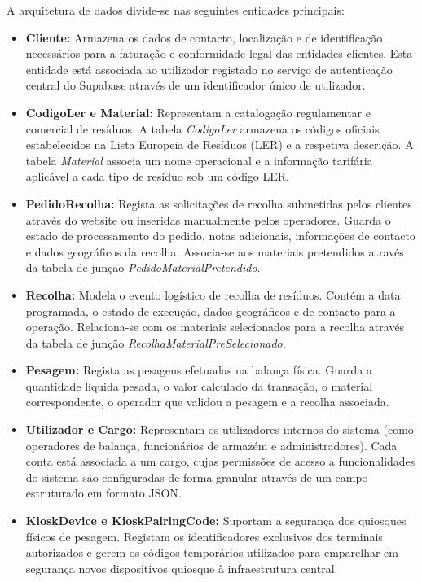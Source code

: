 A arquitetura de dados divide-se nas seguintes entidades principais:
\begin{itemize}
    \item \textbf{Cliente:} Armazena os dados de contacto, localização e de identificação necessários para a faturação e conformidade legal das entidades clientes. Esta entidade está associada ao utilizador registado no serviço de autenticação central do Supabase através de um identificador único de utilizador.
    \item \textbf{CodigoLer e Material:} Representam a catalogação regulamentar e comercial de resíduos. A tabela \textit{CodigoLer} armazena os códigos oficiais estabelecidos na Lista Europeia de Resíduos (LER) e a respetiva descrição. A tabela \textit{Material} associa um nome operacional e a informação tarifária aplicável a cada tipo de resíduo sob um código LER.
    \item \textbf{PedidoRecolha:} Regista as solicitações de recolha submetidas pelos clientes através do website ou inseridas manualmente pelos operadores. Guarda o estado de processamento do pedido, notas adicionais, informações de contacto e dados geográficos da recolha. Associa-se aos materiais pretendidos através da tabela de junção \textit{PedidoMaterialPretendido}.
    \item \textbf{Recolha:} Modela o evento logístico de recolha de resíduos. Contém a data programada, o estado de execução, dados geográficos e de contacto para a operação. Relaciona-se com os materiais selecionados para a recolha através da tabela de junção \textit{RecolhaMaterialPreSelecionado}.
    \item \textbf{Pesagem:} Regista as pesagens efetuadas na balança física. Guarda a quantidade líquida pesada, o valor calculado da transação, o material correspondente, o operador que validou a pesagem e a recolha associada.
    \item \textbf{Utilizador e Cargo:} Representam os utilizadores internos do sistema (como operadores de balança, funcionários de armazém e administradores). Cada conta está associada a um cargo, cujas permissões de acesso a funcionalidades do sistema são configuradas de forma granular através de um campo estruturado em formato \ac{JSON}.
    \item \textbf{KioskDevice e KioskPairingCode:} Suportam a segurança dos quiosques físicos de pesagem. Registam os identificadores exclusivos dos terminais autorizados e gerem os códigos temporários utilizados para emparelhar em segurança novos dispositivos quiosque à infraestrutura central.

\end{itemize}
